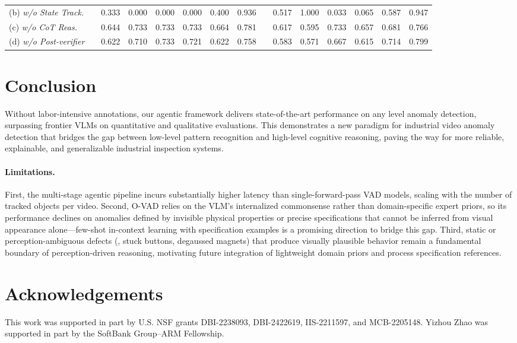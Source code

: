 \documentclass[runningheads]{llncs}
\newcommand{\cc}{\cellcolor{degraded}}
\begin{document}
\begin{table}[t]
{\begin{tabular}{ll cccccc l cccccc}
(b) \textit{w/o State Track.}
  & & \cc 0.333 & \cc 0.000 & \cc 0.000 & \cc 0.000 & \cc 0.400 & 0.936
  & & \cc 0.517 & 1.000 & \cc 0.033 & \cc 0.065 & \cc 0.587 & 0.947 \\
(c) \textit{w/o CoT Reas.}
  & & 0.644 & 0.733 & 0.733 & 0.733 & \cc 0.664 & \cc 0.781
  & & \cc 0.617 & \cc 0.595 & 0.733 & \cc 0.657 & \cc 0.681 & \cc 0.766 \\
(d) \textit{w/o Post-verifier}
  & & 0.622 & 0.710 & 0.733 & 0.721 & \cc 0.622 & \cc 0.758
  & & \cc 0.583 & \cc 0.571 & \cc 0.667 & \cc 0.615 & \cc 0.714 & 0.799 \\
\bottomrule
\end{tabular}
}
\end{table}




\section{Conclusion}


Without labor-intensive annotations, our agentic framework delivers state-of-the-art performance on any level anomaly detection, surpassing frontier VLMs on quantitative and qualitative evaluations. This demonstrates a new paradigm for industrial video anomaly detection that bridges the gap between low-level pattern recognition and high-level cognitive reasoning, paving the way for more reliable, explainable, and generalizable industrial inspection systems.



\paragraph{\textbf{Limitations.}}

First, the multi-stage agentic pipeline incurs substantially higher latency than single-forward-pass VAD models, scaling with the number of tracked objects per video.
Second, O-VAD relies on the VLM's internalized commonsense rather than domain-specific expert priors, so its performance declines on anomalies defined by invisible physical properties or precise specifications 
that cannot be inferred from visual appearance alone---few-shot in-context learning with specification examples is a promising direction to bridge this gap.
Third, static or perception-ambiguous defects (\eg, stuck buttons, degaussed magnets) that produce visually plausible behavior remain a fundamental boundary of perception-driven reasoning, motivating future integration of lightweight domain priors and process specification references.



\section*{Acknowledgements}

This work was supported in part by U.S. NSF grants DBI-2238093, DBI-2422619, IIS-2211597, and MCB-2205148. Yizhou Zhao was supported in part by the SoftBank Group–ARM Fellowship. 





\end{document}

